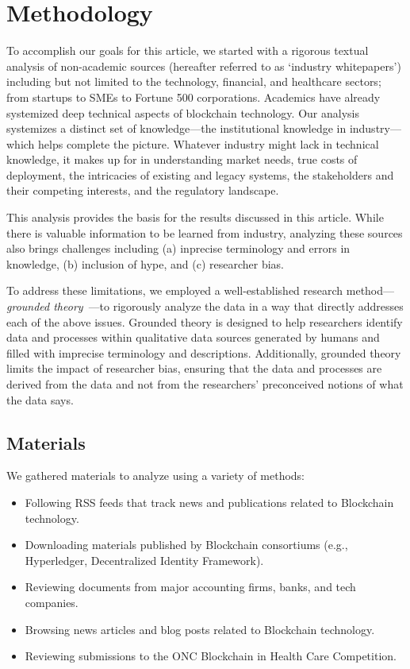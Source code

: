 
\section{Methodology}
\label{sec:method}

To accomplish our goals for this article, we started with a rigorous textual analysis of non-academic sources (hereafter referred to as `industry whitepapers') including but not limited to the technology, financial, and healthcare sectors; from startups to SMEs to Fortune 500 corporations. Academics have already systemized deep technical aspects of blockchain technology. Our analysis  systemizes a distinct set of knowledge---the institutional knowledge in industry---which helps complete the picture. Whatever industry might lack in technical knowledge, it makes up for in understanding market needs, true costs of deployment, the intricacies of existing and legacy systems, the stakeholders and their competing interests, and the regulatory landscape.

This analysis provides the basis for the results discussed in this article. While there is valuable information to be learned from industry, analyzing these sources also brings challenges including (a) inprecise terminology and errors in knowledge, (b) inclusion of hype, and (c) researcher bias.


To address these limitations, we employed a well-established research 
method---\emph{grounded theory}~\cite{corbin1990grounded,wolfswinkel2013using}---to rigorously analyze the data in a way that directly addresses each of the above issues. Grounded theory is designed to help researchers identify data and processes within qualitative data sources generated by humans and filled with imprecise terminology and descriptions. Additionally, grounded theory limits the impact of researcher bias, ensuring that the data and processes are derived from the data and not from the researchers' preconceived notions of what the data says.

\subsection{Materials}

We gathered materials to analyze using a variety of methods:

\begin{itemize}
	\item Following RSS feeds that track news and publications related to 
	Blockchain technology.
	\item Downloading materials published by Blockchain consortiums (e.g., 
	Hyperledger, Decentralized Identity Framework).
	\item Reviewing documents from major accounting firms, banks, and tech companies.
	\item Browsing news articles and blog posts related to Blockchain technology.
	\item Reviewing submissions to the ONC Blockchain in Health Care Competition.
\end{itemize}

